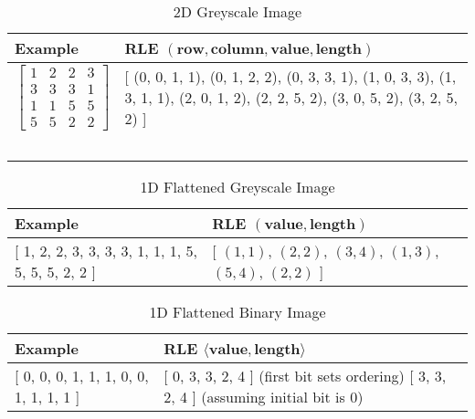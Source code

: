 \begin{table}[h]

    \begin{tabularx}{\textwidth}{ X | X }
        \toprule
        Example & RLE $(\textbf{row}, \textbf{column}, \textbf{value}, \textbf{length})$\\
        \midrule

        $$\begin{bmatrix}
        1 & 2 & 2 & 3  \\
        3 & 3 & 3 & 1  \\
        1 & 1 & 5 & 5  \\
        5 & 5 & 2 & 2
        \end{bmatrix}$$

        &
        {[} (0, 0, 1, 1), (0, 1, 2, 2), (0, 3, 3, 1), \newline
        (1, 0, 3, 3), (1, 3, 1, 1), (2, 0, 1, 2), \newline
        (2, 2, 5, 2), (3, 0, 5, 2), (3, 2, 5, 2) {]} \\
        \ & \ \\
    \bottomrule
    \end{tabularx}

    \label{table:rle-2d}
    \caption{2D Greyscale Image}
\end{table}


\begin{table}[h]
    \begin{tabularx}{\textwidth}{ X | X }
        \toprule
        Example & RLE $(\textbf{value}, \textbf{length})$\\
        \midrule

        {[} 1, 2, 2, 3, 3, 3, 3, 1, 1, 1, 5, 5, 5, 5, 2, 2 {]}
        &
        {[} $(1, 1)$,
        $(2, 2)$,
        $(3, 4)$,
        $(1, 3)$,
        $(5, 4)$,
        $(2, 2)$ {]} \\
    \bottomrule
    \end{tabularx}

    \label{table:rle-1d}
    \caption{1D Flattened Greyscale Image}
\end{table}

\begin{table}[h]
    \begin{tabularx}{\textwidth}{ X | X }
        \toprule
        Example & RLE $\langle \textbf{value}, \textbf{length} \rangle$\\
        \midrule

        {[} 0, 0, 0, 1, 1, 1, 0, 0, 1, 1, 1, 1 {]}
        &
        {[} 0, 3, 3, 2, 4 {]} (first bit sets ordering)\newline
        {[} 3, 3, 2, 4 {]} (assuming initial bit is 0) \\
    \bottomrule
    \end{tabularx}

    \label{table:rle-1d-binary}
    \caption{1D Flattened Binary Image}
\end{table}

